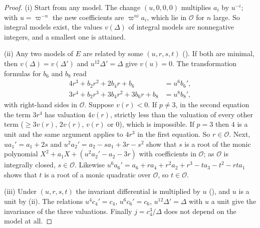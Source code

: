 \begin{proof}
(i) Start from any model. The change $(u,0,0,0)$ multiplies $a_i$ by $u^{-i}$; with $u=\varpi^{-n}$ the new
coefficients are $\varpi^{ni}a_i$, which lie in $\mathcal O$ for $n$ large. So integral models exist, the values
$v(\Delta)$ of integral models are nonnegative integers, and a smallest one is attained.

(ii) Any two models of $E$ are related by some $(u,r,s,t)$ (). If both are minimal, then
$v(\Delta)=v(\Delta')$ and $u^{12}\Delta'=\Delta$ give $v(u)=0$. The transformation formulas for $b_6$ and $b_8$
read
\begin{align*}
4r^3+b_2r^2+2b_4r+b_6&=u^6b_6',\\
3r^4+b_2r^3+3b_4r^2+3b_6r+b_8&=u^8b_8',
\end{align*}
with right-hand sides in $\mathcal O$. Suppose $v(r)<0$. If $p\ne3$, in the second equation the term $3r^4$ has
valuation $4v(r)$, strictly less than the valuation of every other term ($\ge3v(r)$, $2v(r)$, $v(r)$ or $0$),
which is impossible. If $p=3$ then $4$ is a unit and the same argument applies to $4r^3$ in the first
equation. So $r\in\mathcal O$. Next, $ua_1'=a_1+2s$ and $u^2a_2'=a_2-sa_1+3r-s^2$ show that $s$ is a root of the
monic polynomial $X^2+a_1X+(u^2a_2'-a_2-3r)$ with coefficients in $\mathcal O$; as $\mathcal O$ is integrally closed,
$s\in\mathcal O$. Likewise $u^6a_6'=a_6+ra_4+r^2a_2+r^3-ta_3-t^2-rta_1$ shows that $t$ is a root of a monic
quadratic over $\mathcal O$, so $t\in\mathcal O$.

(iii) Under $(u,r,s,t)$ the invariant differential is multiplied by $u$ (), and $u$ is a unit
by (ii). The relations $u^4c_4'=c_4$, $u^6c_6'=c_6$, $u^{12}\Delta'=\Delta$ with $u$ a unit give the invariance of
the three valuations. Finally $j=c_4^3/\Delta$ does not depend on the model at all.
\end{proof}

